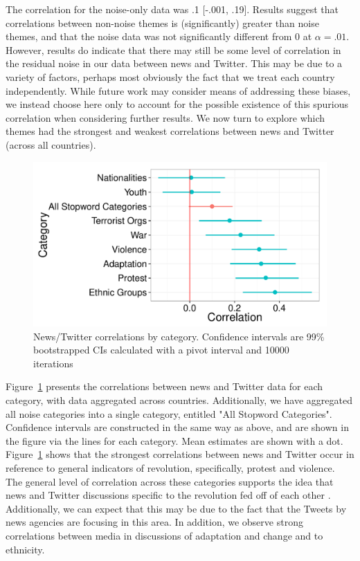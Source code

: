 The correlation for the noise-only data was .1 [-.001, .19].  Results suggest that correlations between non-noise themes is (significantly) greater than noise themes, and that the noise data was not significantly different from 0 at $\alpha=.01$. However, results do indicate that there may still be some level of correlation in the residual noise in our data between news and Twitter.  This may be due to a variety of factors, perhaps most obviously the fact that we treat each country independently.  While future work may consider means of addressing these biases, we instead choose here only to account for the possible existence of this spurious correlation when considering further results. We now turn to explore which themes had the strongest and weakest correlations between news and Twitter (across all countries). 

\begin{figure}
	\centering
	\includegraphics[width=.5\textwidth]{imgs/cat_corr}
	\caption{News/Twitter correlations by category.  Confidence intervals are 99\% bootstrapped CIs calculated with a pivot interval and 10000 iterations}
	\label{fig:cat_corr}
\end{figure}

Figure~\ref{fig:cat_corr} presents the correlations between news and Twitter data for each category, with data aggregated across countries. Additionally, we have aggregated all noise categories into a single category, entitled "All Stopword Categories".  Confidence intervals are constructed in the same way as above, and are shown in the figure via the lines for each category. Mean estimates are shown with a dot.  Figure~\ref{fig:cat_corr} shows that the strongest correlations between news and Twitter occur in reference to general indicators of revolution, specifically, protest and violence. The general level of correlation across these categories supports the idea that news and Twitter discussions specific to the revolution fed off of each other \citep{cottle_media_2011,comunello_will_2012}. Additionally, we can expect that this may be due to the fact that the Tweets by news agencies are focusing in this area. In addition, we observe strong correlations between media in discussions of adaptation and change and to ethnicity. 


